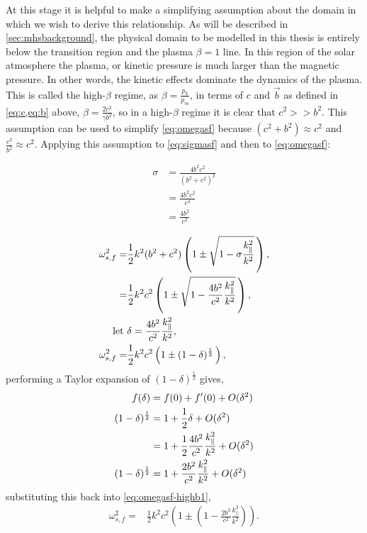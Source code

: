 At this stage it is helpful to make a simplifying assumption about the domain in which we wish to derive this relationship.
As will be described in \cref{sec:mhsbackground}, the physical domain to be modelled in this thesis is entirely below the transition region and the plasma $\beta = 1$ line.
In this region of the solar atmosphere the plasma, or kinetic pressure is much larger than the magnetic pressure.
In other words, the kinetic effects dominate the dynamics of the plasma.
This is called the high-$\beta$ regime, as $\displaystyle\beta = \frac{p_k}{p_m}$, in terms of $c$ and $\vec{b}$ as defined in \cref{eq:c,eq:b} above, $\displaystyle\beta = \frac{2c^2}{\gamma b^2}$, so in a high-$\beta$ regime it is clear that $c^2 >> b^2$.
This assumption can be used to simplify \cref{eq:omegasf} because $(c^2 + b^2) \approx c^2$ and $\displaystyle \frac{c^2}{b^2} \approx c^2$.
Applying this assumption to \cref{eq:sigmasf} and then to \cref{eq:omegasf}:

\begin{align}
    \sigma &= \frac{4b^2c^2}{(b^2+c^2)^2}\\
           &= \frac{4b^2c^2}{c^4}\\
           &= \frac{4b^2}{c^2}
\end{align}

\begin{align}
    \omega^2_{s,f} =& \frac{1}{2}k^2(b^2+c^2)\left(1 \pm \sqrt{1 - \sigma \frac{k^2_\parallel}{k^2}}\,\right),\\
                   =& \frac{1}{2}k^2c^2\left(1 \pm \sqrt{1 - \frac{4b^2}{c^2} \frac{k^2_\parallel}{k^2}}\,\right),\\
    \text{let }& \delta = \frac{4b^2}{c^2} \frac{k^2_\parallel}{k^2},\notag\\
    \omega^2_{s,f} =& \frac{1}{2}k^2c^2\left(1 \pm (1 - \delta)^{\frac{1}{2}}\,\right),\label{eq:omegasf-highb1}
\end{align}
performing a Taylor expansion of $(1-\delta)^{\frac{1}{2}}$ gives,
\begin{align}
    f(\delta) &= f(0) + f^\prime(0) + O(\delta^2)\notag\\
    (1-\delta)^{\frac{1}{2}} &= 1 + \frac{1}{2}\delta + O(\delta^2)\\
                             &= 1 + \frac{1}{2}\frac{4b^2}{c^2} \frac{k^2_\parallel}{k^2} + O(\delta^2)\\
    (1-\delta)^{\frac{1}{2}} &= 1 + \frac{2b^2}{c^2} \frac{k^2_\parallel}{k^2} + O(\delta^2)
\end{align}
substituting this back into \cref{eq:omegasf-highb1},
\begin{align}
    \omega^2_{s,f} =& \frac{1}{2}k^2c^2\left(1 \pm \left(1 - \frac{2b^2}{c^2} \frac{k^2_\parallel}{k^2}\right)\right).
\end{align}

